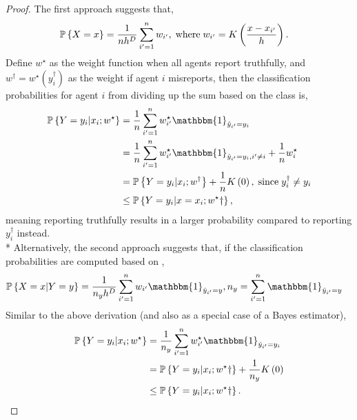 \documentclass{article}
\begin{document}
\begin{proof} \label{proof:kdepf} 
The first approach suggests that,
\begin{align*}
\mathbb{P}\left\{X = x\right\} &= \dfrac{1}{n h^{D}} \displaystyle\sum_{i'=1}^{n} w_{i'}, \text{\;where\;} w_{i'} = K\left(\dfrac{x - x_{i'}}{h}\right).
\end{align*}
Define $w^\star $ as the weight function when all agents report truthfully, and $w^{\dagger} = w^\star \left(y^{\dagger}_{i}\right)$ as the weight if agent $i $ misreports, then the classification probabilities for agent $i $ from dividing up the sum based on the class is,
\begin{align*}
\mathbb{P}\left\{Y = y_{i} | x_{i} ; w^\star \right\} &= \dfrac{1}{n} \displaystyle\sum_{i'=1}^{n} w^\star _{i'} \mathbbm{1}_{\hat{y}_{i'} = y_{i}}
\\ &= \dfrac{1}{n} \displaystyle\sum_{i'=1}^{n} w^\star _{i'} \mathbbm{1}_{\hat{y}_{i'} = y_{i}, i' \neq  i} + \dfrac{1}{n} w^\star _{i}
\\ &= \mathbb{P}\left\{Y = y_{i} | x_{i} ; w^{\dagger}\right\} + \dfrac{1}{n} K\left(0\right), \text{\;since\;} y^{\dagger}_{i} \neq  y_{i}
\\ &\leq  \mathbb{P}\left\{Y = y_{i} | x = x_{i} ; w^\star \dagger\right\},
\end{align*}
meaning reporting truthfully results in a larger probability compared to reporting $y^{\dagger}_{i}$ instead.
\\* Alternatively, the second approach suggests that, if the classification probabilities are computed based on \citet*{taylor1997classification},
\begin{align*}
\mathbb{P}\left\{X = x | Y = y\right\} &= \dfrac{1}{n_{y} h^{D}} \displaystyle\sum_{i'=1}^{n} w_{i'} \mathbbm{1}_{\hat{y}_{i'} = y}, n_{y} = \displaystyle\sum_{i'=1}^{n} \mathbbm{1}_{\hat{y}_{i'} = y}
\end{align*}
Similar to the above derivation (and also as a special case of a Bayes estimator),
\begin{align*}
\mathbb{P}\left\{Y = y_{i} | x_{i} ; w^\star \right\} &= \dfrac{1}{n_{y}} \displaystyle\sum_{i'=1}^{n} w^\star _{i'} \mathbbm{1}_{\hat{y}_{i'} = y_{i}}
\\ &= \mathbb{P}\left\{Y = y_{i} | x_{i} ; w^\star \dagger\right\} + \dfrac{1}{n_{y}} K\left(0\right)
\\ &\leq  \mathbb{P}\left\{Y = y_{i} | x_{i} ; w^\star \dagger\right\}.
\end{align*}\end{proof}
\end{document}
